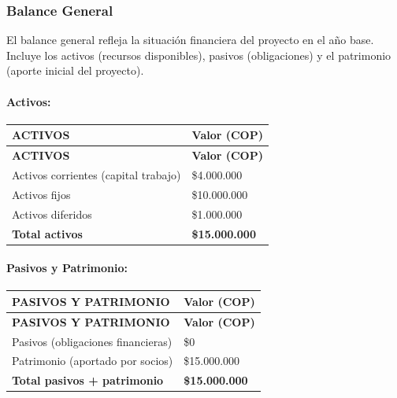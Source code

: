 \documentclass[letterpaper, 11pt]{report}
\begin{document}
\subsubsection{Balance General}
El balance general refleja la situación financiera del proyecto en el año base. Incluye los activos (recursos disponibles), pasivos (obligaciones) y el patrimonio (aporte inicial del proyecto).

\paragraph{Activos:} 
\begin{longtable}{|p{}|p{}|}
\hline
\textbf{ACTIVOS} & \textbf{Valor (COP)} \\
\hline
\endfirsthead

\hline
\textbf{ACTIVOS} & \textbf{Valor (COP)} \\
\hline
\endhead

\hline
\endfoot

\hline
\endlastfoot

Activos corrientes (capital trabajo) & \$4.000.000 \\
\hline
Activos fijos & \$10.000.000 \\
\hline
Activos diferidos & \$1.000.000 \\
\hline
\textbf{Total activos} & \textbf{\$15.000.000} \\
\hline
\end{longtable}

\paragraph{Pasivos y Patrimonio:}
\begin{longtable}{|p{}|p{}|}
\hline
\textbf{PASIVOS Y PATRIMONIO} & \textbf{Valor (COP)} \\
\hline
\endfirsthead

\hline
\textbf{PASIVOS Y PATRIMONIO} & \textbf{Valor (COP)} \\
\hline
\endhead

\hline
\endfoot

\hline
\endlastfoot

Pasivos (obligaciones financieras) & \$0 \\
\hline
Patrimonio (aportado por socios) & \$15.000.000 \\
\hline
\textbf{Total pasivos + patrimonio} & \textbf{\$15.000.000} \\
\hline
\end{longtable}
\end{document}
